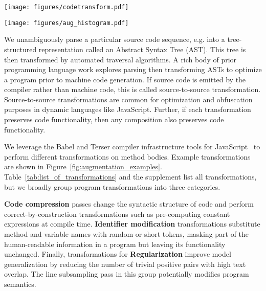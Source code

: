 \documentclass{article}
\begin{document}
\begin{figure*}[t]
\centering
\begin{minipage}{.69\linewidth}
  \centering
  \texttt{[image: figures/codetransform.pdf]}
    \label{fig:augmentation_examples}
\end{minipage}\hfill \begin{minipage}{.29\linewidth}
  \centering
  \texttt{[image: figures/aug\_histogram.pdf]}
  \label{fig:augmentation_histogram}
\end{minipage}
\end{figure*} 
We unambiguously parse a particular source code sequence, e.g.  into a tree-structured representation  called an Abstract Syntax Tree (AST).
This tree is then transformed by automated traversal algorithms.
A rich body of prior programming language work explores parsing then transforming ASTs to optimize a program prior to machine code generation. If source code is emitted by the compiler rather than machine code, this is called source-to-source transformation. Source-to-source transformations are common for optimization and obfuscation purposes in dynamic languages like JavaScript. Further, if each transformation preserves code functionality, then any composition also preserves code functionality.

We leverage the Babel and Terser compiler infrastructure tools for JavaScript~\citep{babel_github,terser_github} to perform different transformations on method bodies. Example transformations are shown in Figure~\ref{fig:augmentation_examples}. Table~\ref{tab:list_of_transformations} and the supplement list all transformations, but we broadly group program transformations into three categories.

\textbf{Code compression} passes change the syntactic structure of code and perform correct-by-construction transformations such as pre-computing constant expressions at compile time. \textbf{Identifier modification} transformations substitute method and variable names with random or short tokens, masking part of the human-readable information in a program but leaving its functionality unchanged. Finally, transformations for \textbf{Regularization} improve model generalization by reducing the number of trivial positive pairs with high text overlap. The line subsampling pass in this group potentially modifies program semantics.
\end{document}
